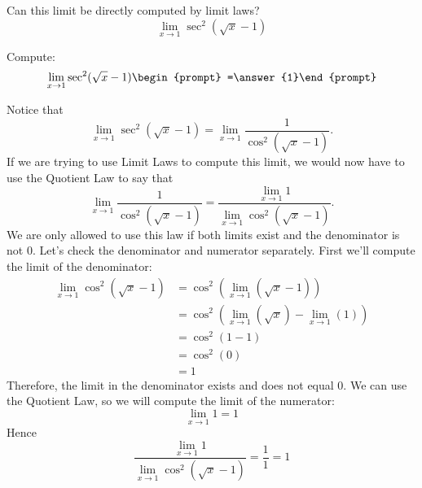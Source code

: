 \documentclass{ximera}
\begin{document}
\begin{question}
  Can this limit be directly computed by limit laws?
  \[
  \displaystyle\lim_{x\to 1}\sec^2(\sqrt{x}-1)
  \]
  \begin{multipleChoice}
  \end{multipleChoice}
  \begin{question}
    Compute:
    \[
    \displaystyle\lim_{x\to 1}\sec^2(\sqrt{x}-1)\begin{prompt} =\answer{1}\end{prompt}
    \]
    \begin{feedback}
      Notice that
      \[
      \displaystyle\lim_{x\to 1} \sec^2(\sqrt{x}-1) = \lim_{x\to 1} \frac{1}{\cos^2(\sqrt{x}-1)}.
      \]
      If we are trying to use Limit Laws to compute this limit, we
      would now have to use the Quotient Law to say that
      \[
      \displaystyle\lim_{x\to 1} \frac{1}{\cos^2(\sqrt{x}-1)} = \frac{ \lim_{x\to 1}1}{
        \lim_{x\to 1}\cos^2(\sqrt{x}-1)}.
      \]
      We are only allowed to use this law if both limits exist and the
      denominator is not $0$.  Let's check the denominator and numerator
      separately. First we'll compute the limit of the denominator:
      \begin{align*}
        \displaystyle\lim_{x\to 1}\cos^2(\sqrt{x}-1) &= \cos^2(\lim_{x\to 1}(\sqrt{x}-1))\\
        &=\cos^2(\lim_{x\to 1}(\sqrt{x})-\lim_{x\to 1}(1))\\
        &=\cos^2(1-1)\\
        &= \cos^2(0)\\
        &=1
      \end{align*}
      Therefore, the limit in the denominator exists and does not
      equal $0$. We can use the Quotient Law, so we will compute the limit of the numerator:
      \[
      \lim_{x\to 1}1=1
      \]
      Hence
      \[
      \frac{ \lim_{x\to 1}1}{ \lim_{x\to 1}\cos^2(\sqrt{x}-1)} =
      \frac{1}{1}=1
      \]
    \end{feedback}
  \end{question}
\end{question}
\end{document}
